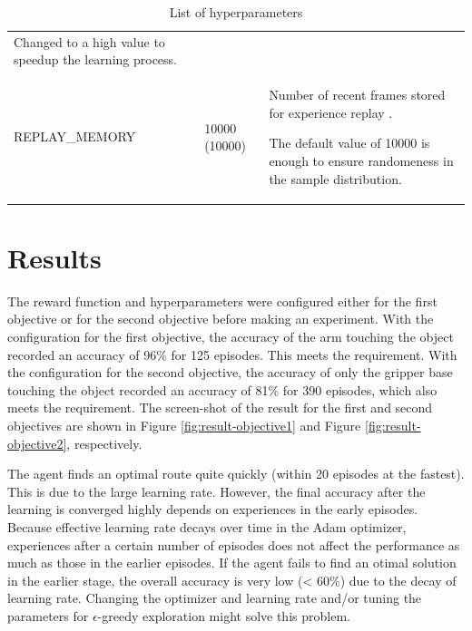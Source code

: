 \documentclass[a4paper]{article}
\begin{document}
\begin{table}[htp]
\begin{tabular}{p{3.5cm}|p{1.5cm}|p{8.5cm}}
Changed to a high value to speedup the learning process. \\
REPLAY\_MEMORY & 10000 (10000) & Number of recent frames stored for experience replay \cite{Zhan2016}.

The default value of 10000 is enough to ensure randomeness in the sample distribution. \\
\end{tabular}
\caption{List of hyperparameters}
\label{tab:hyperparameters}
\end{table}

\section{Results}
The reward function and hyperparameters were configured either for the first objective or for the second objective before making an experiment. With the configuration for the first objective, the accuracy of the arm touching the object recorded an accuracy of 96\% for 125 episodes. This meets the requirement. With the configuration for the second objective, the accuracy of only the gripper base touching the object recorded an accuracy of 81\% for 390 episodes, which also meets the requirement. The screen-shot of the result for the first and second objectives are shown in Figure \ref{fig:result-objective1} and Figure \ref{fig:result-objective2}, respectively.

The agent finds an optimal route quite quickly (within 20 episodes at the fastest). This is due to the large learning rate. However, the final accuracy after the learning is converged highly depends on experiences in the early episodes. Because effective learning rate decays over time in the Adam optimizer, experiences after a certain number of episodes does not affect the performance as much as those in the earlier episodes. If the agent fails to find an otimal solution in the earlier stage, the overall accuracy is very low (< 60\%) due to the decay of learning rate. Changing the optimizer and learning rate and/or tuning the parameters for \(\epsilon\)-greedy exploration might solve this problem.
\end{document}

